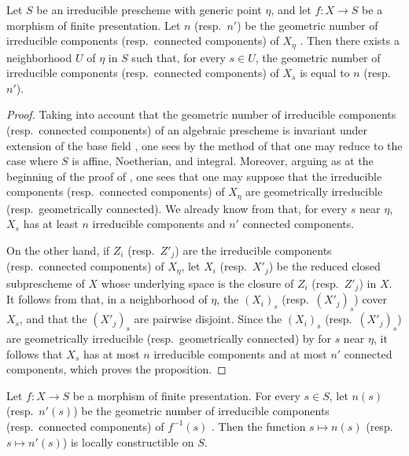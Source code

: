 \begin{proposition}[9.7.8]
\label{IV.9.7.8}
Let $S$ be an irreducible prescheme with generic point $\eta$, and let $f:X\to S$ be a morphism of finite presentation. Let $n$ (resp.\ $n'$) be the geometric number of irreducible components (resp.\ connected components) of $X_\eta$ . Then there exists a neighborhood $U$ of $\eta$ in $S$ such that, for every $s\in U$, the geometric number of irreducible components (resp.\ connected components) of $X_s$ is equal to $n$ (resp.\ $n'$).
\end{proposition}

\begin{proof}
Taking into account that the geometric number of irreducible components (resp.\ connected components) of an algebraic prescheme is invariant under extension of the base field , one sees by the method of  that one may reduce to the case where $S$ is affine, Noetherian, and integral. Moreover, arguing as at the beginning of the proof of , one sees that one may suppose that the irreducible components (resp.\ connected components) of $X_\eta$ are geometrically irreducible (resp.\ geometrically connected). We already know from  that, for every $s$ near $\eta$, $X_s$ has at least $n$ irreducible components and $n'$ connected components.

On the other hand, if $Z_i$ (resp.\ $Z'_j$) are the irreducible components (resp.\ connected components) of $X_\eta$, let $X_i$ (resp.\ $X'_j$) be the reduced closed subprescheme of $X$ whose underlying space is the closure of $Z_i$ (resp.\ $Z'_j$) in $X$. It follows from  that, in a neighborhood of $\eta$, the $(X_i)_s$ (resp.\ $(X'_j)_s$) cover $X_s$, and that the $(X'_j)_s$ are pairwise disjoint. Since the $(X_i)_s$ (resp.\ $(X'_j)_s$) are geometrically irreducible (resp.\ geometrically connected) by  for $s$ near $\eta$, it follows that $X_s$ has at most $n$ irreducible components and at most $n'$ connected components, which proves the proposition.
\end{proof}

\begin{corollary}[9.7.9]
\label{IV.9.7.9}
Let $f:X\to S$ be a morphism of finite presentation. For every $s\in S$, let $n(s)$ (resp.\ $n'(s)$) be the geometric number of irreducible components (resp.\ connected components) of $f^{-1}(s)$ . Then the function $s\mapsto n(s)$ (resp.\ $s\mapsto n'(s)$) is locally constructible on $S$.
\end{corollary}


